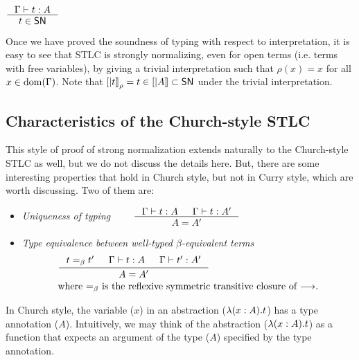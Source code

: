 \begin{corollary}
	$\inference{\Gamma |- t : A}{t \in \SN}$
\end{corollary}
Once we have proved the soundness of typing with respect to interpretation,
it is easy to see that STLC is strongly normalizing, even for open terms (i.e. terms with
free variables), by giving a trivial
interpretation such that $\rho(x) = x$ for all $x\in\mathop{\mathrm{dom}}(\Gamma)$. Note that
$[|t|]_\rho = t \in [|A|] \subset \mathsf{SN}$ under the trivial interpretation.



\subsection{Characteristics of the Church-style STLC}\label{sec:stlc:church}

This style of proof of strong normalization extends naturally
to the Church-style STLC as well, but we do not discuss the details
here. But, there are some interesting properties that hold in Church style,
but not in Curry style, which are worth discussing. Two of them are:
\begin{itemize}
\item \emph{Uniqueness of typing}
$\qquad\inference{\Gamma |- t : A & \Gamma |- t : A'}{A = A'} $

\item \emph{Type equivalence between well-typed $\beta$-equivalent terms}
\begin{align*}
& \inference{t =_{\beta} t' & \Gamma |- t : A & \Gamma |- t' : A'}{A = A'} \\
& \text{where $=_{\beta}$ is the reflexive symmetric transitive closure of $-->$.}
\end{align*}
\end{itemize}

In Church style, the variable ($x$) in an abstraction
($\lambda(x:A).t$) has a type annotation ($A$). Intuitively, we may think of
the abstraction ($\lambda(x:A).t$) as a function that expects an argument of
the type ($A$) specified by the type annotation.



